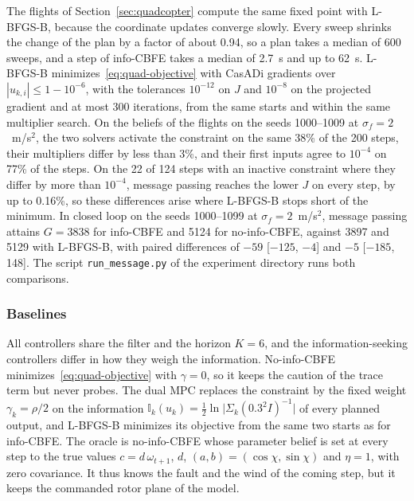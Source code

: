 \documentclass{l4dc2027}
\begin{document}
The flights of Section~\ref{sec:quadcopter} compute the same fixed point with L-BFGS-B, because the coordinate updates converge slowly. Every sweep shrinks the change of the plan by a factor of about 0.94, so a plan takes a median of 600 sweeps, and a step of info-CBFE takes a median of 2.7~s and up to 62~s. L-BFGS-B minimizes~\eqref{eq:quad-objective} with CasADi gradients over $|u_{k,i}| \leq 1 - 10^{-6}$, with the tolerances $10^{-12}$ on $J$ and $10^{-8}$ on the projected gradient and at most 300 iterations, from the same starts and within the same multiplier search. On the beliefs of the flights on the seeds 1000--1009 at $\sigma_f = 2$~m/s$^2$, the two solvers activate the constraint on the same 38\% of the 200 steps, their multipliers differ by less than 3\%, and their first inputs agree to $10^{-4}$ on 77\% of the steps. On the 22 of 124 steps with an inactive constraint where they differ by more than $10^{-4}$, message passing reaches the lower $J$ on every step, by up to 0.16\%, so these differences arise where L-BFGS-B stops short of the minimum. In closed loop on the seeds 1000--1099 at $\sigma_f = 2$~m/s$^2$, message passing attains $G = 3838$ for info-CBFE and 5124 for no-info-CBFE, against 3897 and 5129 with L-BFGS-B, with paired differences of $-59$ [$-125$, $-4$] and $-5$ [$-185$, 148]. The script \texttt{run\_message.py} of the experiment directory runs both comparisons.

\subsubsection{Baselines}\label{supp:quad-baselines}

All controllers share the filter and the horizon $K = 6$, and the information-seeking controllers differ in how they weigh the information. No-info-CBFE minimizes~\eqref{eq:quad-objective} with $\gamma = 0$, so it keeps the caution of the trace term but never probes. The dual MPC replaces the constraint by the fixed weight $\gamma_k = \rho/2$ on the information $\mathbb{I}_k(u_k) = \tfrac{1}{2}\ln\big|\Sigma_k (0.3^2 I)^{-1}\big|$ of every planned output, and L-BFGS-B minimizes its objective from the same two starts as for info-CBFE. The oracle is no-info-CBFE whose parameter belief is set at every step to the true values $c = d\,\omega_{t+1}$, $d$, $(a, b) = (\cos\chi, \sin\chi)$ and $\eta = 1$, with zero covariance. It thus knows the fault and the wind of the coming step, but it keeps the commanded rotor plane of the model.
\end{document}
